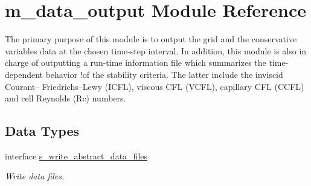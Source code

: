 \hypertarget{namespacem__data__output}{}\section{m\+\_\+data\+\_\+output Module Reference}
\label{namespacem__data__output}


The primary purpose of this module is to output the grid and the conservative variables data at the chosen time-\/step interval. In addition, this module is also in charge of outputting a run-\/time information file which summarizes the time-\/dependent behavior !of the stability criteria. The latter include the inviscid Courant– Friedrichs–\+Lewy (I\+C\+FL), viscous C\+FL (V\+C\+FL), capillary C\+FL (C\+C\+FL) and cell Reynolds (Rc) numbers.  


\subsection*{Data Types}
\begin{DoxyCompactItemize}
\item 
interface \hyperlink{interfacem__data__output_1_1s__write__abstract__data__files}{s\+\_\+write\+\_\+abstract\+\_\+data\+\_\+files}
\begin{DoxyCompactList}\small\item\em Write data files. \end{DoxyCompactList}\end{DoxyCompactItemize}
